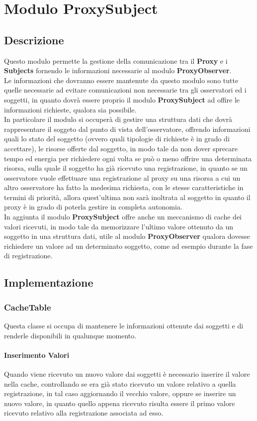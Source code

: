 \chapter{Modulo ProxySubject}
\section{Descrizione}
Questo modulo permette la gestione della comunicazione tra il \textbf{Proxy} e i \textbf{Subjects} fornendo le informazioni necessarie al modulo \textbf{ProxyObserver}.\\
Le informazioni che dovranno essere mantenute da questo modulo sono tutte quelle necessarie ad evitare comunicazioni non necessarie tra gli osservatori ed i soggetti, in quanto dovrà essere proprio il modulo \textbf{ProxySubject} ad offire le informazioni richieste, qualora sia possibile. \\
In particolare il modulo si occuperà di gestire una struttura dati che dovrà rappresentare il soggeto dal punto di vista dell'osservatore, offrendo informazioni quali lo stato del soggetto (ovvero quali tipologie di richieste è in grado di accettare), le risorse offerte dal soggetto, in modo tale da non dover sprecare tempo ed energia per richiedere ogni volta se può o meno offrire una determinata risorsa, sulla quale il soggetto ha già ricevuto una registrazione, in quanto se un osservatore vuole effettuare una registrazione al proxy su una risorsa a cui un altro osservatore ha fatto la medesima richiesta, con le stesse caratteristiche in termini di priorità, allora quest'ultima non sarà inoltrata al soggetto in quanto il proxy è in grado di poterla gestire in completa autonomia. \\
In aggiunta il modulo  \textbf{ProxySubject} offre anche un meccanismo di cache dei valori ricevuti, in modo tale da memorizzare l'ultimo valore ottenuto da un soggetto in una struttura dati, utile al modulo \textbf{ProxyObserver} qualora dovesse richiedere un valore ad un determinato soggetto, come ad esempio durante la fase di registrazione.
\section{Implementazione}
\subsection{CacheTable}
Questa classe si occupa di mantenere le informazioni ottenute dai soggetti e di renderle disponibili in qualunque momento.
\subsubsection{Inserimento Valori}
Quando viene ricevuto un nuovo valore dai soggetti è necessario inserire il valore nella cache, controllando se era già stato ricevuto un valore relativo a quella registrazione, in tal caso aggiornando il vecchio valore, oppure se inserire un nuovo valore, in quanto quello appena ricevuto risulta essere il primo valore ricevuto relativo alla registrazione associata ad esso. \\

